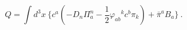 \begin{equation}
Q = \int d^{3}x~ \{ c^{a}(-D_{n} \Pi_{a}^{n} -\frac{1}{2}{\varphi_{ab}}^{k} c^{b} \pi_{k}) + {\bar{\pi}}^{a} B_{a}\}~.
                                        \label{eq:byuzkirkuc}  
\end{equation}


